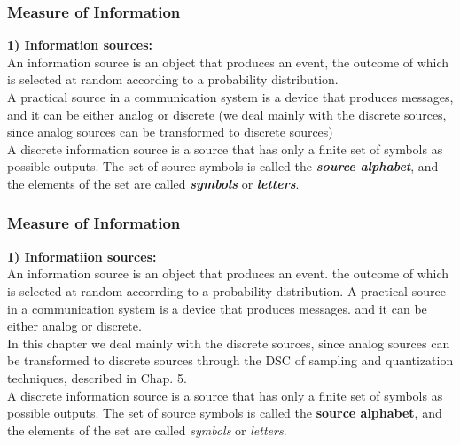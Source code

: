 \documentclass[a4]{beamer}
\begin{document}
\begin{frame}
\frametitle{Measure of Information}

\textbf{1) Information sources:}\\

An information source is an object that produces an event, the outcome of which is selected at
random according to a probability distribution.  \\ \bigskip A practical source in a communication system is a
device that produces messages, and it can be either analog or discrete (we deal mainly
with the discrete sources, since analog sources can be transformed to discrete sources) \\ \bigskip A discrete information source is a
source that has only a finite set of symbols as possible outputs. The set of source symbols is called the
\textbf{\emph{source alphabet}}, and the elements of the set are called \textbf{\emph{ symbols}} or \textbf{\emph{letters}}.
\end{frame}
\begin{frame}

\frametitle{Measure of Information}

\textbf{1) Informatiion sources:}\\

An information source is an object that produces an event. the outcome of which is selected at
random accorrding to a probability distribution. A practical source in a communication system is a
device that produces messages. and it can be either analog or discrete.\\ In this chapter we deal mainly
with the discrete sources, since analog sources can be transformed to discrete sources through the DSC
of sampling and quantization techniques, described in Chap. 5. \\ \bigskip A discrete information source is a
source that has only a finite set of symbols as possible outputs. The set of source symbols is called the
\textbf{source alphabet}, and the elements of the set are called \emph{ symbols} or \emph{letters}.
\end{frame}
\end{document}
